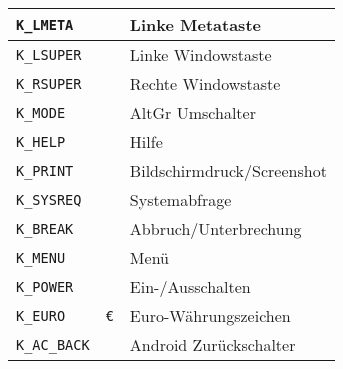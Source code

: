 \begin{longtable}{lll}
\texttt{K\_LMETA}        &  \verb+ +     &  Linke Metataste\\ \hline
\texttt{K\_LSUPER}       &  \verb+ +     &  Linke Windowstaste\\ \hline
\texttt{K\_RSUPER}       &  \verb+ +     &  Rechte Windowstaste\\ \hline
\texttt{K\_MODE}         &  \verb+ +     &  AltGr Umschalter\\ \hline
\texttt{K\_HELP}         &  \verb+ +     &  Hilfe\\ \hline
\texttt{K\_PRINT}        &  \verb+ +     &  Bildschirmdruck/Screenshot\\ \hline
\texttt{K\_SYSREQ}       &  \verb+ +     &  Systemabfrage\\ \hline
\texttt{K\_BREAK}        &  \verb+ +     &  Abbruch/Unterbrechung\\ \hline
\texttt{K\_MENU}         &  \verb+ +     &  Menü\\ \hline
\texttt{K\_POWER}        &  \verb+ +     &  Ein-/Ausschalten\\ \hline
\texttt{K\_EURO}         &  \verb+€+     &  Euro-Währungszeichen\\ \hline
\texttt{K\_AC\_BACK}     &  \verb+ +     &  Android Zurückschalter\\ \hline
\end{longtable} 

